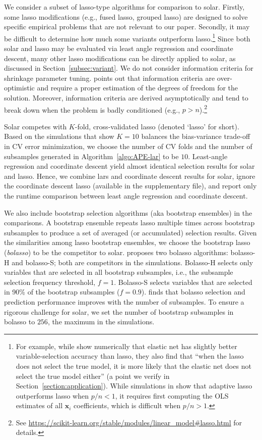 \documentclass[11pt,review,authoryear]{elsarticle}
\begin{document}
We consider a subset of lasso-type algorithms for comparison to solar. Firstly, some lasso modifications (e.g., fused lasso, grouped lasso) are designed to solve specific empirical problems that are not relevant to our paper. Secondly, it may be difficult to determine how much some variants outperform lasso.\footnote{For example, while \citet{jia2010model} show numerically that elastic net has slightly better variable-selection accuracy than lasso, they also find that ``when the lasso does not select the true model, it is more likely that the elastic net does not select the true model either'' (a point we verify in Section~\ref{section:application}). While simulations in \citet{zou2006adaptive} show that adaptive lasso outperforms lasso when $p/n<1$, it requires first computing the OLS estimates of all $\mathbf{x}_i$ coefficients, which is difficult when $p/n>1$.} Since both solar and lasso may be evaluated via least angle regression and coordinate descent, many other lasso modifications can be directly applied to solar, as discussed in Section~\ref{subsec:variant}. We do not consider information criteria for shrinkage parameter tuning. \citet{scikit-learn} points out that information criteria are over-optimistic and require a proper estimation of the degrees of freedom for the solution. Moreover, information criteria are derived asymptotically and tend to break down when the problem is badly conditioned (e.g., $p > n$).\footnote{See \url{https://scikit-learn.org/stable/modules/linear_model\#lasso.html} for details.}

Solar competes with $K$-fold, cross-validated lasso (denoted `lasso' for short). Based on the \citet{friedman2001elements} simulations that show $K = 10$ balances the bias-variance trade-off in CV error minimization, we choose the number of CV folds and the number of subsamples generated in Algorithm~\ref{algo:APE-lar} to be $10$. Least-angle regression and coordinate descent yield almost identical selection results for solar and lasso. Hence, we combine lars and coordinate descent results for solar, ignore the coordinate descent lasso (available in the supplementary file), and report only the runtime comparison between least angle regression and coordinate descent.

We also include bootstrap selection algorithms (aka bootstrap ensembles) in the comparisons. A bootstrap ensemble repeats lasso multiple times across bootstrap subsamples to produce a set of averaged (or accumulated) selection results. Given the similarities among lasso bootstrap ensembles, we choose the \citet{bach2008bolasso} bootstrap lasso (\emph{bolasso}) to be the competitor to solar. \citet{bach2008bolasso} proposes two bolasso algorithms: bolasso-H and bolasso-S; both are competitors in the simulations. Bolasso-H selects only variables that are selected in all bootstrap subsamples, i.e., the subsample selection frequency threshold, $f=1$. Bolasso-S selects variables that are selected in 90\% of the bootstrap subsamples ($f=0.9$). \citet{bach2008bolasso} finds that bolasso selection and prediction performance improves with the number of subsamples. To ensure a rigorous challenge for solar, we set the number of bootstrap subsamples in bolasso to $256$, the maximum in the \citet{bach2008bolasso} simulations.
\end{document}
